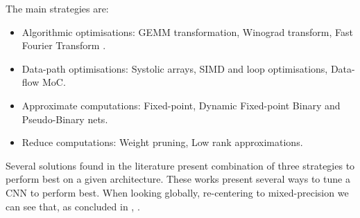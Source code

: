 The main strategies are:
\begin{itemize}
	\item Algorithmic optimisations: GEMM transformation, Winograd transform, Fast Fourier Transform .
	\item Data-path optimisations: Systolic arrays, SIMD and loop optimisations, Data-flow MoC.
	\item Approximate computations: Fixed-point, Dynamic Fixed-point Binary and Pseudo-Binary nets.
	\item Reduce computations: Weight pruning, Low rank approximations.
\end{itemize}

Several solutions found in the literature present combination of three strategies to perform best on a given architecture. These works present several ways to tune a CNN to perform best. When looking globally, re-centering to mixed-precision we can see that, as concluded in \cite{Abdelouahab2018}, .
